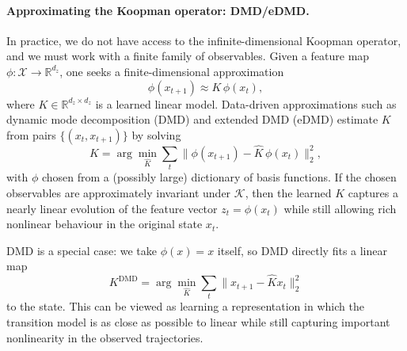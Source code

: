 \paragraph{Approximating the Koopman operator: DMD/eDMD.}
In practice, we do not have access to the infinite-dimensional Koopman operator, and we must work with a finite family of observables.
Given a feature map $\phi : \mathcal{X} \to \mathbb{R}^{d_z}$, one seeks a finite-dimensional approximation
\begin{equation}
\phi(x_{t+1}) \approx K\, \phi(x_t),
\end{equation}
where $K \in \mathbb{R}^{d_z \times d_z}$ is a learned linear model.
Data-driven approximations such as dynamic mode decomposition (DMD) \citep{schmid_dmd_2010, rowley_2009_spectral, tu_dynamic_2014} and extended DMD (eDMD) \citep{williams_datadriven_2015, williams_kernel-based_2016} estimate $K$ from pairs $\{(x_t, x_{t+1})\}$ by solving
\begin{equation}
K = \arg\min_{\hat K} \sum_{t} \big\| \phi(x_{t+1}) - \hat K\, \phi(x_t) \big\|_2^2,
\end{equation}
with $\phi$ chosen from a (possibly large) dictionary of basis functions.
If the chosen observables are approximately invariant under $\mathcal{K}$, then the learned $K$ captures a
nearly linear evolution of the feature vector $z_t = \phi(x_t)$ while still allowing rich nonlinear behaviour
in the original state $x_t$.

DMD is a special case: we take $\phi(x)=x$ itself, so DMD directly fits a linear map
\begin{equation}
K^{\mathrm{DMD}} = \arg\min_{\hat K} \sum_{t} \big\| x_{t+1} - \hat K x_t \big\|_2^2
\end{equation}
to the state.
This can be viewed as learning a representation in which the transition model is as close as possible to linear while still capturing important nonlinearity in the observed trajectories.






